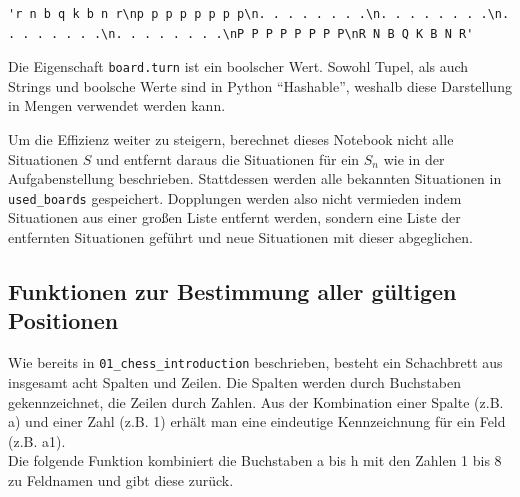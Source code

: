 \documentclass[12pt]{article}
\begin{document}
\begin{verbatim}
'r n b q k b n r\np p p p p p p p\n. . . . . . . .\n. . . . . . . .\n. . . . . . . .\n. . . . . . . .\nP P P P P P P P\nR N B Q K B N R'
\end{verbatim}

Die Eigenschaft \texttt{board.turn} ist ein boolscher Wert. Sowohl
Tupel, als auch Strings und boolsche Werte sind in Python ``Hashable'',
weshalb diese Darstellung in Mengen verwendet werden kann.

Um die Effizienz weiter zu steigern, berechnet dieses Notebook nicht
alle Situationen \(S\) und entfernt daraus die Situationen für ein
\(S_n\) wie in der Aufgabenstellung beschrieben. Stattdessen werden alle
bekannten Situationen in \texttt{used\_boards} gespeichert. Dopplungen
werden also nicht vermieden indem Situationen aus einer großen Liste
entfernt werden, sondern eine Liste der entfernten Situationen geführt
und neue Situationen mit dieser abgeglichen.

    \hypertarget{funktionen-zur-bestimmung-aller-guxfcltigen-positionen}{%
\subsection{Funktionen zur Bestimmung aller gültigen
Positionen}\label{funktionen-zur-bestimmung-aller-guxfcltigen-positionen}}

Wie bereits in \texttt{01\_chess\_introduction} beschrieben, besteht ein
Schachbrett aus insgesamt acht Spalten und Zeilen. Die Spalten werden
durch Buchstaben gekennzeichnet, die Zeilen durch Zahlen. Aus der
Kombination einer Spalte (z.B. a) und einer Zahl (z.B. 1) erhält man
eine eindeutige Kennzeichnung für ein Feld (z.B. a1).\\
Die folgende Funktion kombiniert die Buchstaben a bis h mit den Zahlen 1
bis 8 zu Feldnamen und gibt diese zurück.
\end{document}
